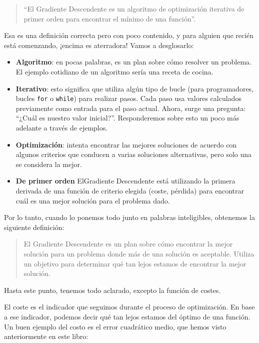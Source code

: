 \documentclass[
]{book}
\providecommand{\tightlist}{%
  \setlength{\itemsep}{0pt}\setlength{\parskip}{0pt}}
\begin{document}
\begin{quote}
``El Gradiente Descendente es un algoritmo de optimización iterativa de primer orden para encontrar el mínimo de una función''.
\end{quote}

Esa es una definición correcta pero con poco contenido, y para alguien que recién está comenzando, ¡encima es aterradora! Vamos a desglosarlo:

\begin{itemize}
\tightlist
\item
  \textbf{Algoritmo}: en pocas palabras, es un plan sobre cómo resolver un problema. El ejemplo cotidiano de un algoritmo sería una receta de cocina.
\item
  \textbf{Iterativo}: esto significa que utiliza algún tipo de bucle (para programadores, bucles \texttt{for} o \texttt{while}) para realizar pasos. Cada paso usa valores calculados previamente como entrada para el paso actual. Ahora, surge una pregunta: ``¿Cuál es nuestro valor inicial?''. Responderemos sobre esto un poco más adelante a través de ejemplos.
\item
  \textbf{Optimización}: intenta encontrar las mejores soluciones de acuerdo con algunos criterios que conducen a varias soluciones alternativas, pero solo una se considera la mejor.
\item
  \textbf{De primer orden} ElGradiente Descendente está utilizando la primera derivada de una función de criterio elegida (coste, pérdida) para encontrar cuál es una mejor solución para el problema dado.
\end{itemize}

Por lo tanto, cuando lo ponemos todo junto en palabras inteligibles, obtenemos la siguiente definición:

\begin{quote}
El Gradiente Descendente es un plan sobre cómo encontrar la mejor solución para un problema donde más de una solución es aceptable. Utiliza un objetivo para determinar qué tan lejos estamos de encontrar la mejor solución.
\end{quote}

Hasta este punto, tenemos todo aclarado, excepto la función de costes.

El coste es el indicador que seguimos durante el proceso de optimización. En base a ese indicador, podemos decir qué tan lejos estamos del óptimo de una función. Un buen ejemplo del costo es el error cuadrático medio, que hemos visto anteriormente en este libro:
\end{document}
